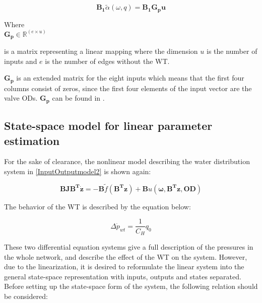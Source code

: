 \begin{equation}
\bm{B_1} \tilde{\alpha}(\omega, q) = \bm{B_1} \bm{G_p} \bm{u}
\label{gamma_lin}
\end{equation}

\begin{minipage}[t]{0.24\textwidth}
Where\\
\hspace*{8mm} $\bm{G_p} \in \bm{\mathbb{R}}^{(e \times u)} $ 
\end{minipage}
\begin{minipage}[t]{0.74\textwidth}
\vspace*{2mm}
is a matrix representing a linear mapping where the dimension $u$ is the number of inputs and $e$ is the number of edges without the WT. 
\end{minipage} 

$\bm{G_p}$ is an extended matrix for the eight inputs which means that the first four columns consist of zeros, since the first four elements of the input vector are the valve ODs. $\bm{G_p}$ can be found in .

\subsection{State-space model for linear parameter estimation}
 \label{SystemLin}

For the sake of clearance, the nonlinear model describing the water distribution system in \eqref{InputOutputmodel2} is shown again:  

\begin{equation}
\bm{B} \bm{J} \bm{B^T} \bm{\dot{z}} = - \bm{B} \tilde f(\bm{B^T}\bm{z}) + \bm{B} u(\bm{\omega},\bm{B^T}\bm{z},\bm{OD}) 
 \label{InputOutputmodel3}
\end{equation}

The behavior of the WT is described by the equation below: 

\begin{equation}
\Delta \dot{p}_{wt} = \frac{1}{C_H} q_0
 \label{WT_eq}
\end{equation}

These two differential equation systems give a full description of the pressures in the whole network, and  describe the effect of the WT on the system. However, due to the linearization, it is desired to reformulate the linear system into the general state-space representation with inputs, outputs and states separated. 
\\
Before setting up the state-space form of the system, the following relation should be considered: 

